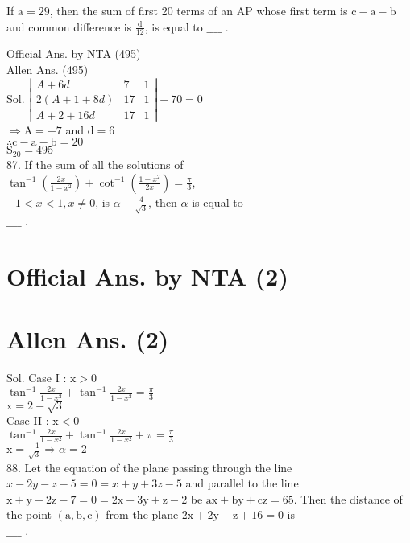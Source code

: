 \documentclass[10pt]{article}
\begin{document}
If \(\mathrm{a}=29\), then the sum of first 20 terms of an AP whose first term is \(\mathrm{c}-\mathrm{a}-\mathrm{b}\) and common difference is \(\frac{\mathrm{d}}{12}\), is equal to \(\_\_\_\_\) .

Official Ans. by NTA (495)\\
Allen Ans. (495)\\
Sol. \(\left|\begin{array}{lll}A+6 d & 7 & 1 \\ 2(A+1+8 d) & 17 & 1 \\ A+2+16 d & 17 & 1\end{array}\right|+70=0\)\\
\(\Rightarrow \mathrm{A}=-7\) and \(\mathrm{d}=6\)\\
\(\therefore \mathrm{c}-\mathrm{a}-\mathrm{b}=20\)\\
\(\mathrm{S}_{20}=495\)\\
87. If the sum of all the solutions of\\
\(\tan ^{-1}\left(\frac{2 x}{1-x^{2}}\right)+\cot ^{-1}\left(\frac{1-x^{2}}{2 x}\right)=\frac{\pi}{3}\),\\
\(-1<x<1, x \neq 0\), is \(\alpha-\frac{4}{\sqrt{3}}\), then \(\alpha\) is equal to\\
\(\_\_\_\_\) .

\section*{Official Ans. by NTA (2)}
\section*{Allen Ans. (2)}
Sol. Case I : \(\mathrm{x}>0\)\\
\(\tan ^{-1} \frac{2 x}{1-x^{2}}+\tan ^{-1} \frac{2 x}{1-x^{2}}=\frac{\pi}{3}\)\\
\(\mathrm{x}=2-\sqrt{3}\)\\
Case II : \(\mathrm{x}<0\)\\
\(\tan ^{-1} \frac{2 x}{1-x^{2}}+\tan ^{-1} \frac{2 x}{1-x^{2}}+\pi=\frac{\pi}{3}\)\\
\(\mathrm{x}=\frac{-1}{\sqrt{3}} \Rightarrow \alpha=2\)\\
88. Let the equation of the plane passing through the line\\
\(x-2 y-z-5=0=x+y+3 z-5\) and parallel to the line \(\mathrm{x}+\mathrm{y}+2 \mathrm{z}-7=0=2 \mathrm{x}+3 \mathrm{y}+\mathrm{z}-2\) be \(\mathrm{ax}+\mathrm{by}+\mathrm{cz}=65\). Then the distance of the point \((\mathrm{a}, \mathrm{b}, \mathrm{c})\) from the plane \(2 \mathrm{x}+2 \mathrm{y}-\mathrm{z}+16=0\) is\\
\(\_\_\_\_\) .
\end{document}

